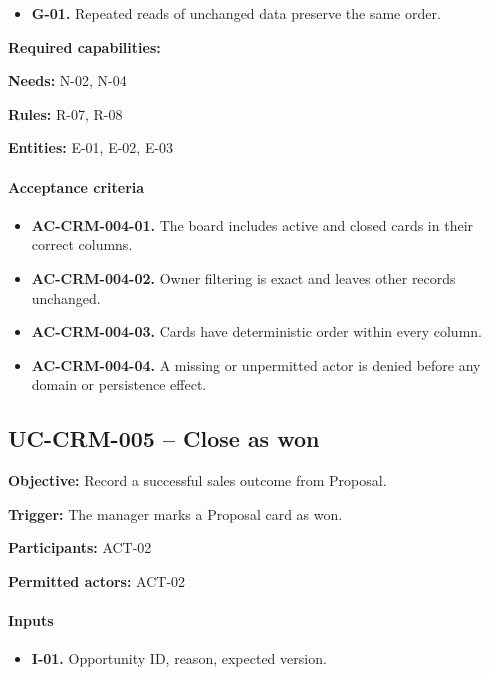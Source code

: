 \documentclass[10pt,a4paper]{article}
\begin{document}
\begin{itemize}

\item \textbf{G-01.} Repeated reads of unchanged data preserve the same order.

\end{itemize}

\textbf{Required capabilities:}

\textbf{Needs:} N-02, N-04

\textbf{Rules:} R-07, R-08

\textbf{Entities:} E-01, E-02, E-03

\paragraph{Acceptance criteria}

\begin{itemize}

\item \textbf{AC-CRM-004-01.} The board includes active and closed cards in their correct columns.

\item \textbf{AC-CRM-004-02.} Owner filtering is exact and leaves other records unchanged.

\item \textbf{AC-CRM-004-03.} Cards have deterministic order within every column.

\item \textbf{AC-CRM-004-04.} A missing or unpermitted actor is denied before any domain or persistence effect.

\end{itemize}

\subsection{UC-CRM-005 -- Close as won}

\textbf{Objective:} Record a successful sales outcome from Proposal.

\textbf{Trigger:} The manager marks a Proposal card as won.

\textbf{Participants:} ACT-02

\textbf{Permitted actors:} ACT-02

\paragraph{Inputs}

\begin{itemize}

\item \textbf{I-01.} Opportunity ID, reason, expected version.

\end{itemize}
\end{document}
